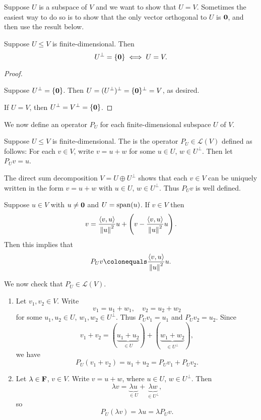 Suppose $U$ is a subspace of $V$ and we want to show that $U=V$. Sometimes the easiest way to do so is to show that the only vector orthogonal to $U$ is $\vb{0}$, and then use the result below. 

\begin{corollary}
Suppose $U\le V$ is finite-dimensional. Then
\[U^\perp=\{\vb{0}\}\iff U=V.\]
\end{corollary}

\begin{proof} \

\fbox{$\implies$} Suppose $U^\perp=\{\vb{0}\}$. Then $U=(U^\perp)^\perp=\{\vb{0}\}^\perp=V$, as desired.

\fbox{$\impliedby$} If $U=V$, then $U^\perp=V^\perp=\{\vb{0}\}$.
\end{proof}

We now define an operator $P_U$ for each finite-dimensional subspace $U$ of $V$.

\begin{definition}
Suppose $U\le V$ is finite-dimensional. The  is the operator $P_U\in\mathcal{L}(V)$ defined as follows: For each $v\in V$, write $v=u+w$ for some $u\in U$, $w\in U^\perp$. Then let $P_U v=u$.
\end{definition}

\begin{remark}
The direct sum decomposition $V=U\oplus U^\perp$ shows that each $v\in V$ can be uniquely written in the form $v=u+w$ with $u\in U$, $w\in U^\perp$. Thus $P_U v$ is well defined.
\end{remark}

Suppose $u\in V$ with $u\neq\vb{0}$ and $U=\operatorname{span}(u)$. If $v\in V$ then
\[v=\frac{\left\langle v,u\right\rangle}{\norm{u}^2}u+\left(v-\frac{\left\langle v,u\right\rangle}{\norm{u}^2}u\right).\]
Then this implies that
\[P_U v\colonequals\frac{\angbrac{v,u}}{\norm{u}^2}u.\]

We now check that $P_U\in\mathcal{L}(V)$.
\begin{enumerate}[label=(\roman*)]
\item Let $v_1,v_2\in V$. Write
\[v_1=u_1+w_1,\quad v_2=u_2+w_2\]
for some $u_1,u_2\in U$, $w_1,w_2\in U^\perp$. Thus $P_U v_1=u_1$ and $P_U v_2=u_2$. Since
\[v_1+v_2=(\underbrace{u_1+u_2}_{\in U})+(\underbrace{w_1+w_2}_{\in U^\perp}),\]
we have
\[P_U(v_1+v_2)=u_1+u_2=P_U v_1+P_U v_2.\]
\item Let $\lambda\in\mathbf F$, $v\in V$. Write $v=u+w$, where $u\in U$, $w\in U^\perp$. Then
\[\lambda v=\underbrace{\lambda u}_{\in U}+\underbrace{\lambda w}_{\in U^\perp},\]
so
\[P_U(\lambda v)=\lambda u=\lambda P_U v.\]
\end{enumerate}

